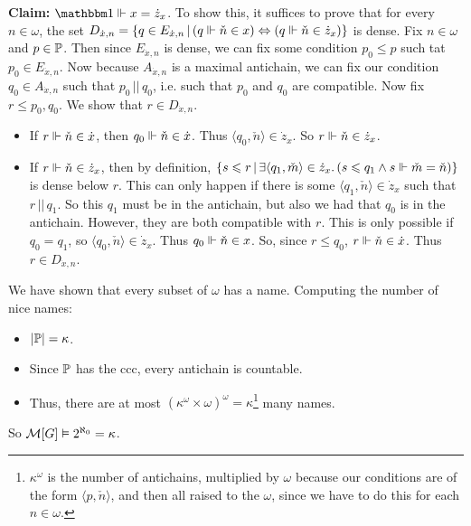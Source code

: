 \documentclass{article}
\begin{document}
    \textbf{Claim:} $\bbone \forces x = \dot{z}_{x}$. \gap
    To show this, it suffices to prove that for every $n \in \omega$, the set $D_{\dot{x},n} = \{ q \in E_{\dot{x},n} \, | \, (q \Vdash \check{n} \in x) \Leftrightarrow (q \Vdash \check{n} \in \dot{z}_{x})\}$ is dense. Fix $n \in \omega$ and $p \in \mathbb{P}$. Then since $E_{\dot{x},n}$ is dense, we can fix some condition $p_{0} \leq p$ such tat $p_{0} \in E_{\dot{x},n}$. Now because $A_{\dot{x},n}$ is a maximal antichain, we can fix our condition $q_{0} \in A_{\dot{x},n}$ such that $p_{0} \, || \, q_{0}$, i.e. such that $p_{0}$ and $q_{0}$ are compatible. Now fix $r \leq p_{0}, q_{0}$. We show that $r \in D_{\dot{x},n}$.
    \begin{itemize}
        \item If $r \Vdash \check{n} \in \dot{x}$, then $q_{0} \Vdash \check{n} \in \dot{x}$. Thus $\langle q_{0}, \check{n} \rangle \in \dot{z}_{x}$. So $r \Vdash \check{n} \in \dot{z}_{x}$.
        \item If $r \Vdash \check{n} \in \dot{z}_{x}$, then by definition, $\{ s \leqslant r \, | \, \exists \langle q_{1}, \check{m} \rangle \in \dot{z}_{x}. \, ( s \leqslant q_{1} \wedge s \Vdash \check{m} = \check{n})\}$ is dense below $r$. This can only happen if there is some $\langle q_{1}, \check{n} \rangle \in \dot{z}_{x}$ such that $r \, || \, q_{1}$. So this $q_{1}$ must be in the antichain, but also we had that $q_{0}$ is in the antichain. However, they are both compatible with $r$. This is only possible if $q_{0} = q_{1}$, so $\langle q_{0}, \check{n} \rangle \in \dot{z}_{x}$. Thus $q_{0} \Vdash \check{n} \in x$. So, since $r \leq q_{0}$, $r \Vdash \check{n} \in \dot{x}$. Thus $r \in D_{\dot{x},n}$.
    \end{itemize}
    We have shown that every subset of $\omega$ has a  name. Computing the number of nice names: \begin{itemize}
        \item $|\mathbb{P}| = \kappa$.
        \item Since $\mathbb{P}$ has the ccc, every antichain is countable.
        \item Thus, there are at most $(\kappa^{\omega} \times \omega)^{\omega} = \kappa$\footnote{$\kappa^{\omega}$ is the number of antichains, multiplied by $\omega$ because our conditions are of the form $\langle p, \check{n}\rangle$, and then all raised to the $\omega$, since we have to do this for each $n \in \omega$.} many  names.
    \end{itemize}
    So $\mathcal{M}[G] \vDash 2^{\aleph_{0}}=\kappa$. \endproof
\end{document}
